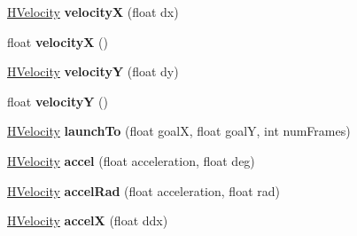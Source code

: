 \begin{DoxyCompactItemize}
\item 
\hypertarget{classhype_1_1behavior_1_1_h_velocity_a0bc49a845f80bada67082e07334f2472}{\hyperlink{classhype_1_1behavior_1_1_h_velocity}{H\-Velocity} {\bfseries velocity\-X} (float dx)}\label{classhype_1_1behavior_1_1_h_velocity_a0bc49a845f80bada67082e07334f2472}

\item 
\hypertarget{classhype_1_1behavior_1_1_h_velocity_a469184301800322041f55f972829494b}{float {\bfseries velocity\-X} ()}\label{classhype_1_1behavior_1_1_h_velocity_a469184301800322041f55f972829494b}

\item 
\hypertarget{classhype_1_1behavior_1_1_h_velocity_afbb6fed1e65bef526d495911d8c1acf3}{\hyperlink{classhype_1_1behavior_1_1_h_velocity}{H\-Velocity} {\bfseries velocity\-Y} (float dy)}\label{classhype_1_1behavior_1_1_h_velocity_afbb6fed1e65bef526d495911d8c1acf3}

\item 
\hypertarget{classhype_1_1behavior_1_1_h_velocity_abe7dc26576adae8adb48ce955702fff0}{float {\bfseries velocity\-Y} ()}\label{classhype_1_1behavior_1_1_h_velocity_abe7dc26576adae8adb48ce955702fff0}

\item 
\hypertarget{classhype_1_1behavior_1_1_h_velocity_ade008f6666ba982dfa247e6eb16e39c8}{\hyperlink{classhype_1_1behavior_1_1_h_velocity}{H\-Velocity} {\bfseries launch\-To} (float goal\-X, float goal\-Y, int num\-Frames)}\label{classhype_1_1behavior_1_1_h_velocity_ade008f6666ba982dfa247e6eb16e39c8}

\item 
\hypertarget{classhype_1_1behavior_1_1_h_velocity_a688277ffa9fc211da32da7f1671f0b43}{\hyperlink{classhype_1_1behavior_1_1_h_velocity}{H\-Velocity} {\bfseries accel} (float acceleration, float deg)}\label{classhype_1_1behavior_1_1_h_velocity_a688277ffa9fc211da32da7f1671f0b43}

\item 
\hypertarget{classhype_1_1behavior_1_1_h_velocity_a7c3bf557241fa32dc95a88682a1557e9}{\hyperlink{classhype_1_1behavior_1_1_h_velocity}{H\-Velocity} {\bfseries accel\-Rad} (float acceleration, float rad)}\label{classhype_1_1behavior_1_1_h_velocity_a7c3bf557241fa32dc95a88682a1557e9}

\item 
\hypertarget{classhype_1_1behavior_1_1_h_velocity_a76fdbb8a084fd536c8d2f4245a9e9578}{\hyperlink{classhype_1_1behavior_1_1_h_velocity}{H\-Velocity} {\bfseries accel\-X} (float ddx)}\label{classhype_1_1behavior_1_1_h_velocity_a76fdbb8a084fd536c8d2f4245a9e9578}


\end{DoxyCompactItemize}
